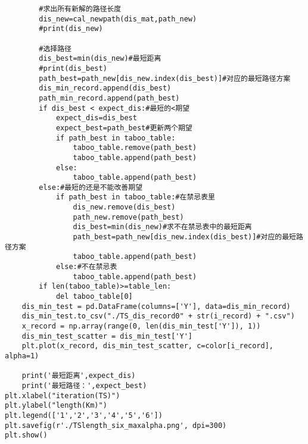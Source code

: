 \begin{lstlisting}
        #求出所有新解的路径长度
        dis_new=cal_newpath(dis_mat,path_new)
        #print(dis_new)

        #选择路径
        dis_best=min(dis_new)#最短距离
        #print(dis_best)
        path_best=path_new[dis_new.index(dis_best)]#对应的最短路径方案
        dis_min_record.append(dis_best)
        path_min_record.append(path_best)
        if dis_best < expect_dis:#最短的<期望
            expect_dis=dis_best
            expect_best=path_best#更新两个期望
            if path_best in taboo_table:
                taboo_table.remove(path_best)
                taboo_table.append(path_best)
            else:
                taboo_table.append(path_best)
        else:#最短的还是不能改善期望
            if path_best in taboo_table:#在禁忌表里
                dis_new.remove(dis_best)
                path_new.remove(path_best)
                dis_best=min(dis_new)#求不在禁忌表中的最短距离
                path_best=path_new[dis_new.index(dis_best)]#对应的最短路径方案
                taboo_table.append(path_best)
            else:#不在禁忌表
                taboo_table.append(path_best)
        if len(taboo_table)>=table_len:
            del taboo_table[0]
    dis_min_test = pd.DataFrame(columns=['Y'], data=dis_min_record)
    dis_min_test.to_csv("./TS_dis_record0" + str(i_record) + ".csv")
    x_record = np.array(range(0, len(dis_min_test['Y']), 1))
    dis_min_test_scatter = dis_min_test['Y']
    plt.plot(x_record, dis_min_test_scatter, c=color[i_record], alpha=1)

    print('最短距离',expect_dis)
    print('最短路径：',expect_best)
plt.xlabel("iteration(TS)")
plt.ylabel("length(Km)")
plt.legend(['1','2','3','4','5','6'])
plt.savefig(r'./TSlength_six_maxalpha.png', dpi=300)
plt.show()
\end{lstlisting}










